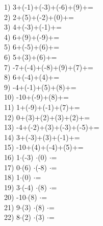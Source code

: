 \documentclass[a4paper,10pt]{article}
\begin{document}
1)   3+(-1)+(-3)+(-6)+(9)+=
\vspace{0.5cm}\\2)   2+(5)+(-2)+(0)+=
\vspace{0.5cm}\\3)   4+(-3)+(-1)+=
\vspace{0.5cm}\\4)   6+(9)+(-9)+=
\vspace{0.5cm}\\5)   6+(-5)+(6)+=
\vspace{0.5cm}\\6)   5+(3)+(6)+=
\vspace{0.5cm}\\7)   -7+(-4)+(-8)+(9)+(7)+=
\vspace{0.5cm}\\8)   6+(-4)+(4)+=
\vspace{0.5cm}\\9)   -4+(-1)+(5)+(8)+=
\vspace{0.5cm}\\10)   -10+(-9)+(8)+=
\vspace{0.5cm}\\11)   1+(-9)+(-1)+(7)+=
\vspace{0.5cm}\\12)   0+(3)+(2)+(3)+(2)+=
\vspace{0.5cm}\\13)   -4+(-2)+(3)+(-3)+(-5)+=
\vspace{0.5cm}\\14)   3+(-3)+(3)+(-1)+=
\vspace{0.5cm}\\15)   -10+(4)+(-4)+(5)+=
\vspace{0.5cm}\\16)   1$\cdot$(-3) $\cdot$(0) $\cdot$=
\vspace{0.5cm}\\17)   0$\cdot$(6) $\cdot$(-8) $\cdot$=
\vspace{0.5cm}\\18)   1$\cdot$(0) $\cdot$=
\vspace{0.5cm}\\19)   3$\cdot$(-4) $\cdot$(8) $\cdot$=
\vspace{0.5cm}\\20)   -10$\cdot$(8) $\cdot$=
\vspace{0.5cm}\\21)   9$\cdot$(3) $\cdot$(8) $\cdot$=
\vspace{0.5cm}\\22)   8$\cdot$(2) $\cdot$(3) $\cdot$=
\end{document}
